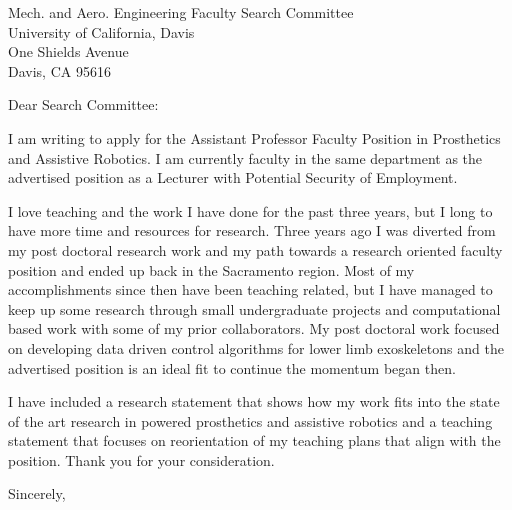 \documentclass{letter}
\begin{document}
\begin{letter}{
    Mech. and Aero. Engineering Faculty Search Committee \\
    University of California, Davis \\
    One Shields Avenue \\
  Davis, CA 95616}
\opening{Dear Search Committee:}

I am writing to apply for the Assistant Professor Faculty Position in
Prosthetics and Assistive Robotics. I am currently faculty in the same
department as the advertised position as a Lecturer with Potential Security of
Employment.

I love teaching and the work I have done for the past three years, but I long
to have more time and resources for research. Three years ago I was diverted
from my post doctoral research work and my path towards a research oriented
faculty position and ended up back in the Sacramento region. Most of my
accomplishments since then have been teaching related, but I have managed to
keep up some research through small undergraduate projects and computational
based work with some of my prior collaborators. My post doctoral work focused
on developing data driven control algorithms for lower limb exoskeletons and
the advertised position is an ideal fit to continue the momentum began then.

I have included a research statement that shows how my work fits into the state
of the art research in powered prosthetics and assistive robotics and a
teaching statement that focuses on reorientation of my teaching plans that
align with the position. Thank you for your consideration.

\closing{Sincerely,}

\end{letter}
\end{document}
